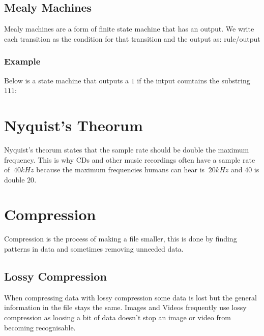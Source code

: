 \documentclass{article}
\begin{document}
\subsection{Mealy Machines}
Mealy machines are a form of finite state machine that has an output.
We write each transition as the condition for that transition and 
the output as: rule/output

\subsubsection{Example}
Below is a state machine that outputs a  $1$ if the intput countains
the substring $111$:
\begin{center}


\end{center}

\section{Nyquist's Theorum}
Nyquist's theorum states that the sample rate should be double the maximum frequency. 
This is why CDs and other music recordings often have a sample rate of $~40\si{kHz}$ because
the maximum frequencies humans can hear is $~20\si{kHz}$ and $40$ is double $20$.


\section{Compression}
Compression is the process of making a file smaller, this is done by finding patterns in data and sometimes
removing unneeded data. 

\subsection{Lossy Compression}
When compressing data with lossy compression some data is lost but the general information in the file stays the same.
Images and Videos frequently use lossy compression as loosing a bit of data doesn't stop an image or video from becoming
recognisable.
\end{document}
